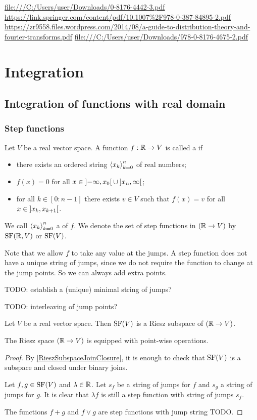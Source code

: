 \url{file:///C:/Users/user/Downloads/0-8176-4442-3.pdf}
\url{https://link.springer.com/content/pdf/10.1007%2F978-0-387-84895-2.pdf}
\url{https://zr9558.files.wordpress.com/2014/08/a-guide-to-distribution-theory-and-fourier-transforms.pdf}
\url{file:///C:/Users/user/Downloads/978-0-8176-4675-2.pdf}

\chapter{Integration}

\section{Integration of functions with real domain}
\subsection{Step functions}
\begin{definition}
Let $V$ be a real vector space. A function $f: \mathbb{R} \to V$ is called a  if
\begin{itemize}
\item there exists an ordered string $\left\langle x_k \right\rangle_{k=0}^n$ of real numbers;
\item $f(x) = 0$ for all $x\in \interval[o]{-\infty, x_0} \cup \interval[o]{x_n, \infty}$;
\item for all $k\in [0:n-1]$ there exists $v\in V$ such that $f(x) = v$ for all $x\in \interval[o]{x_k, x_{k+1}}$.
\end{itemize}
We call $\left\langle x_k \right\rangle_{k=0}^n$ a  of $f$. We denote the set of step functions in $(\mathbb{R}\to V)$ by $\operatorname{SF}(\mathbb{R},V)$ or $\operatorname{SF}(V)$.
\end{definition}
Note that we allow $f$ to take any value at the jumps. A step function does not have a unique string of jumps, since we do not require the function to change at the jump points. So we can always add extra points.

TODO: establish a (unique) minimal string of jumps?


TODO: interleaving of jump points?


\begin{proposition}
Let $V$ be a real vector space. Then $\operatorname{SF}(V)$ is a Riesz subspace of $(\mathbb{R}\to V)$.
\end{proposition}
The Riesz space $(\mathbb{R}\to V)$ is equipped with point-wise operations.
\begin{proof}
By \ref{RieszSubspaceJoinClosure}, it is enough to check that $\operatorname{SF}(V)$ is a subspace and closed under binary joins.

Let $f,g \in \operatorname{SF}(V)$ and $\lambda\in \mathbb{R}$. Let $s_f$ be a string of jumps for $f$ and $s_g$ a string of jumps for $g$. It is clear that $\lambda f$ is still a step function with string of jumps $s_f$.

The functions $f+g$ and $f\vee g$ are step functions with jump string TODO.
\end{proof}

